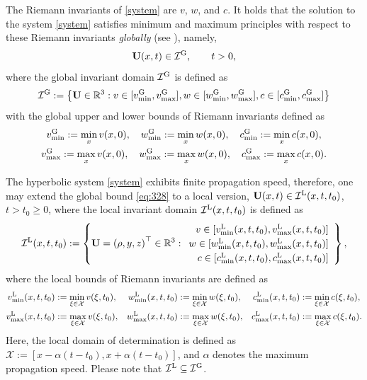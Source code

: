 \documentclass[times,final]{elsarticle}
\numberwithin{equation}{section}
\theoremstyle{definition}
\theoremstyle{remark}
\newcommand{\BU}{\mathbf{U}}
\begin{document}
The Riemann invariants of \eqref{system} are $v$, $w$, and $c$. It holds that the solution to the system \eqref{system} satisfies minimum and maximum principles with respect to these Riemann invariants {\em globally} (see \cite{BagneriniRascle2003}), namely, 
\begin{equation}\label{eq:328}
	\BU(x,t) \in \mathcal{I}^{\rm G},\qquad t > 0,
\end{equation}
where the global invariant domain $\mathcal{I}^{\rm G}$ is defined as
\begin{equation}\label{eq:332}
	\mathcal{I}^{\rm G}
	:= 
	\left\{ 
	\BU
	\in \mathbb{R}^3 
	: 
	v \in [v^{\rm G}_{\min}, v^{\rm G}_{\max}], 
	w \in [w^{\rm G}_{\min}, w^{\rm G}_{\max}],
	c \in [c^{\rm G}_{\min}, c^{\rm G}_{\max}] 
	\right\}
\end{equation}
with the global upper and lower bounds of Riemann invariants defined as
\begin{gather*}
	v^{\rm G}_{\min} := \min_x v(x,0), \quad w^{\rm G}_{\min} := \min_x w(x,0), \quad c^{\rm G}_{\min} := \min_x c(x,0), \\
	v^{\rm G}_{\max} := \max_x v(x,0), \quad w^{\rm G}_{\max} := \max_x w(x,0), \quad c^{\rm G}_{\max} := \max_x c(x,0).
\end{gather*}

The hyperbolic system \eqref{system} exhibits finite propagation speed, therefore, one may extend the global bound \eqref{eq:328} to a local version,
$\BU(x,t) \in \mathcal{I}^{\rm L}(x,t,t_0)$, $t > t_0 \geq 0$,
where the local invariant domain $\mathcal{I}^{\rm L}(x,t,t_0)$ is defined as
\begin{equation}\label{eq:154}
	\mathcal{I}^{\rm L}(x,t,t_0)
	:=
	\left\{ 
	\BU= \left( \rho, y, z \right)^\top \in \mathbb{R}^3 
	: 
	\renewcommand\arraystretch{1.2}
	\begin{array}{r}
		v \in [v^{\rm L}_{\min}(x,t,t_0), v^{\rm L}_{\max}(x,t,t_0)] \\  
		w \in [w^{\rm L}_{\min}(x,t,t_0), w^{\rm L}_{\max}(x,t,t_0)] \\
		c \in [c^{\rm L}_{\min}(x,t,t_0), c^{\rm L}_{\max}(x,t,t_0)] 
	\end{array}
	\right\},
\end{equation}
where the local bounds of Riemann invariants are defined as
\begin{align*}
	v^{\rm L}_{\min}(x,t,t_0) &:= \min_{\xi \in \mathcal{X}} v(\xi,t_0),
	& w^{\rm L}_{\min}(x,t,t_0) &:= \min_{\xi \in  \mathcal{X}} w(\xi,t_0),
	& c^{\rm L}_{\min}(x,t,t_0) &:= \min_{\xi \in \mathcal{X}} c(\xi,t_0), 
	\\
	v^{\rm L}_{\max}(x,t,t_0) &:= \max_{\xi \in  \mathcal{X}} v(\xi,t_0),
	& w^{\rm L}_{\max}(x,t,t_0) &:= \max_{\xi \in  \mathcal{X}} w(\xi,t_0),
	& c^{\rm L}_{\max}(x,t,t_0) &:= \max_{\xi \in \mathcal{X}} c(\xi,t_0).
\end{align*}
Here, the local domain of determination is defined as $\mathcal{X}:=[x-\alpha(t-t_0),x+\alpha(t-t_0)]$, and $\alpha$ denotes the maximum propagation speed. Please note that $\mathcal{I}^{\rm L} \subseteq \mathcal{I}^{\rm G}$.
\end{document}
